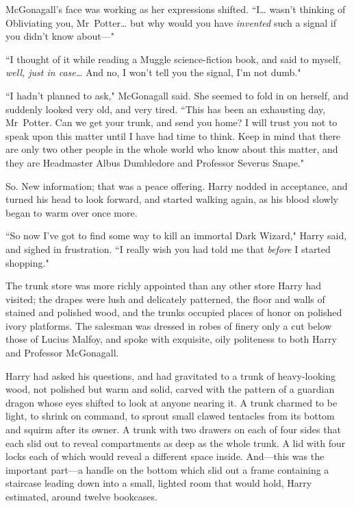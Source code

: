 McGonagall's face was working as her expressions shifted. ``I{\ldots} wasn't thinking of Obliviating you, Mr~Potter{\ldots} but why would you have \emph{invented} such a signal if you didn't know about—"

``I thought of it while reading a Muggle science-fiction book, and said to myself, \emph{well, just in case{\ldots}} And no, I won't tell you the signal, I'm not dumb."

``I hadn't planned to ask," McGonagall said. She seemed to fold in on herself, and suddenly looked very old, and very tired. ``This has been an exhausting day, Mr~Potter. Can we get your trunk, and send you home? I will trust you not to speak upon this matter until I have had time to think. Keep in mind that there are only two other people in the whole world who know about this matter, and they are Headmaster Albus Dumbledore and Professor Severus Snape."

So. New information; that was a peace offering. Harry nodded in acceptance, and turned his head to look forward, and started walking again, as his blood slowly began to warm over once more.

``So now I've got to find some way to kill an immortal Dark Wizard," Harry said, and sighed in frustration. ``I really wish you had told me that \emph{before} I started shopping."

\later

The trunk store was more richly appointed than any other store Harry had visited; the drapes were lush and delicately patterned, the floor and walls of stained and polished wood, and the trunks occupied places of honor on polished ivory platforms. The salesman was dressed in robes of finery only a cut below those of Lucius Malfoy, and spoke with exquisite, oily politeness to both Harry and Professor McGonagall.

Harry had asked his questions, and had gravitated to a trunk of heavy-looking wood, not polished but warm and solid, carved with the pattern of a guardian dragon whose eyes shifted to look at anyone nearing it. A trunk charmed to be light, to shrink on command, to sprout small clawed tentacles from its bottom and squirm after its owner. A trunk with two drawers on each of four sides that each slid out to reveal compartments as deep as the whole trunk. A lid with four locks each of which would reveal a different space inside. And—this was the important part—a handle on the bottom which slid out a frame containing a staircase leading down into a small, lighted room that would hold, Harry estimated, around twelve bookcases.

